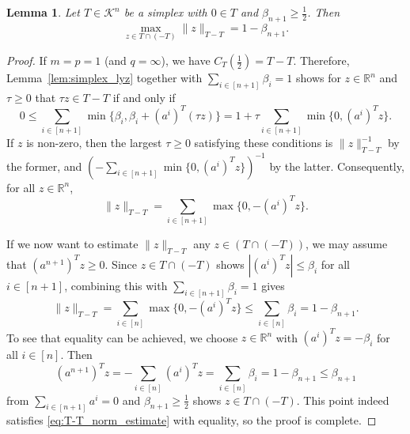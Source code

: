 \documentclass{amsart}
\newtheorem{lemma}[theorem]{Lemma}
\newcommand\R{\mathbb{R}}
\newcommand\CK{\mathcal{K}}
\newcommand{\lyz}[4]{C_{#3} (#4)}
\begin{document}
\begin{lemma}\label{lem:simplex_symmetrizations}
Let $T \in \CK^n$ be a simplex with $0 \in T$ and $\beta_{n+1} \geq \frac{1}{2}$.
Then
\[
	\max_{z \in T \cap (-T)} \|z\|_{T-T}
	= 1 - \beta_{n+1}.
\]
\end{lemma}
\begin{proof}
If $m = p = 1$ (and $q = \infty$), we have $\lyz{p}{m}{T}{\frac{1}{2}} = T-T$.
Therefore, Lemma~\ref{lem:simplex_lyz} together with $\sum_{i \in [n+1]} \beta_i = 1$ shows for $z \in \R^n$ and $\tau \geq 0$ that $\tau z \in T-T$ if and only if
\[
    0
    \leq \sum_{i \in [n+1]} \min \big\{ \beta_i, \beta_i + (a^i)^T (\tau z) \big\}
    = 1 + \tau \sum_{i \in [n+1]} \min \big\{ 0, (a^i)^T z \big\}.
\]
If $z$ is non-zero, then the largest $\tau \geq 0$ satisfying these conditions is $\|z\|_{T-T}^{-1}$ by the former, and $(- \sum_{i \in [n+1]} \min\{ 0, (a^i)^T z \})^{-1}$ by the latter.
Consequently, for all $z \in \R^n$,
\[
    \|z\|_{T-T}
    = \sum_{i \in [n+1]} \max \big\{ 0, -(a^i)^T z \big\}.
\]

If we now want to estimate $\|z\|_{T-T}$ any $z \in (T \cap (-T))$,
we may assume that $(a^{n+1})^T z \geq 0$.
Since $z \in T \cap (-T)$ shows $|(a^i)^T z| \leq \beta_i$ for all $i \in [n+1]$, combining this with $\sum_{i \in [n+1]} \beta_i = 1$ gives
\begin{equation}\label{eq:T-T_norm_estimate}
    \|z\|_{T-T}
    = \sum_{i \in [n]} \max \big\{ 0, -(a^i)^T z \big\}
    \leq \sum_{i \in [n]} \beta_i
    = 1 - \beta_{n+1}.
\end{equation}
To see that equality can be achieved, we choose $z \in \R^n$ with $(a^i)^T z = -\beta_i$ for all $i \in [n]$.
Then
\[
    (a^{n+1})^T z
    = - \sum_{i \in [n]} (a^i)^T z
    = \sum_{i \in [n]} \beta_i
    = 1 - \beta_{n+1}
    \leq \beta_{n+1}
\]
from $\sum_{i \in [n+1]} a^i = 0$ and $\beta_{n+1} \geq \frac{1}{2}$ shows $z \in T \cap (-T)$.
This point indeed satisfies \eqref{eq:T-T_norm_estimate} with equality, so the proof is complete.
\end{proof}
\end{document}

